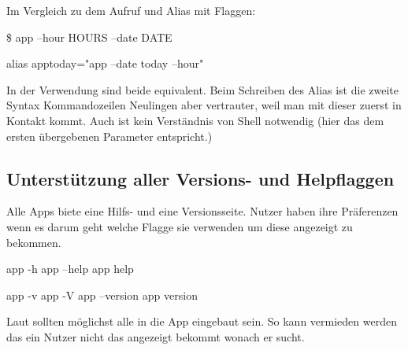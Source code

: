 \documentclass[oneside,bibliography=totocnumbered,BCOR=5mm]{scrbook}
\newenvironment{code}{\captionsetup{type=listing, skip=0pt}}{}
\begin{document}
Im Vergleich zu dem Aufruf und Alias mit Flaggen:

\begin{code}
  \begin{shellcode}
\$ app --hour HOURS --date DATE

alias apptoday="app --date today --hour"
  \end{shellcode}
\end{code}

In der Verwendung sind beide equivalent. Beim Schreiben des Alias ist die zweite
Syntax Kommandozeilen Neulingen aber vertrauter, weil man mit dieser zuerst
in Kontakt kommt. Auch ist kein Verständnis von Shell notwendig (hier das
 dem ersten übergebenen Parameter entspricht.)

\subsection{Unterstützung aller Versions- und Helpflaggen}

Alle Apps biete eine Hilfs- und eine Versionsseite. Nutzer haben ihre Präferenzen
wenn es darum geht welche Flagge sie verwenden um diese angezeigt zu bekommen.

\begin{code}
  \begin{shellcode}
app -h
app --help
app help

app -v
app -V
app --version
app version
  \end{shellcode}
  \medskip
\end{code}

Laut \cite{12factor} sollten möglichst alle in die App eingebaut sein. So kann
vermieden werden das ein Nutzer nicht das angezeigt bekommt wonach er sucht.

\medskip


\bigskip %
\end{document}

